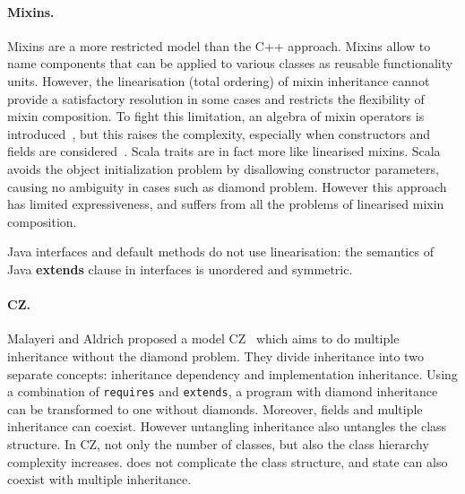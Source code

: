 \paragraph{Mixins.}
Mixins are a more restricted model than the C++ approach. Mixins allow to name
components that can be applied to various classes as reusable functionality
units. However, %
the linearisation (total ordering) of
mixin inheritance cannot provide a satisfactory resolution in some cases and
restricts the flexibility of mixin composition. To fight this limitation, an
algebra of mixin operators is introduced~\cite{ancona2002calculus}, but this
raises the complexity, especially when constructors and fields
are considered~\cite{marco09FJigsaw}. Scala traits are in fact more like linearised mixins.
Scala avoids the object initialization
problem by disallowing constructor parameters, causing no ambiguity in cases
such as diamond problem. However this approach has limited expressiveness, and
suffers from all the problems of linearised mixin composition. %
\begin{comment}
Python also offers multiple inheritance via linearised mixins. Indeed in python any class is implicitly a mixin, and mixin composition informally expressed as\\*
\Q@ class A use B,C {...new methods...}@\\*
can be expressed in python as \\*
\Q@ class Aux: ...new methods...@\\*
\Q@ class A(B,C,Aux): pass@
\end{comment}
\noindent Java interfaces and default methods do not use
linearisation: the semantics of Java \textbf{extends} clause in
interfaces is unordered and symmetric.


\paragraph{CZ.}
Malayeri and Aldrich proposed a model CZ~\cite{malayeri2009cz} which
aims to do multiple inheritance without the diamond problem. They
divide inheritance into two separate concepts: inheritance dependency
and implementation inheritance. Using a combination of
\texttt{requires} and \texttt{extends}, a program with diamond
inheritance can be transformed to one without diamonds. Moreover,
fields and multiple inheritance can coexist. However untangling
inheritance also untangles the class structure. In CZ, not only the
number of classes, but also the class hierarchy complexity
increases. \mixin does not complicate the class structure, and state
can also coexist with multiple inheritance.

